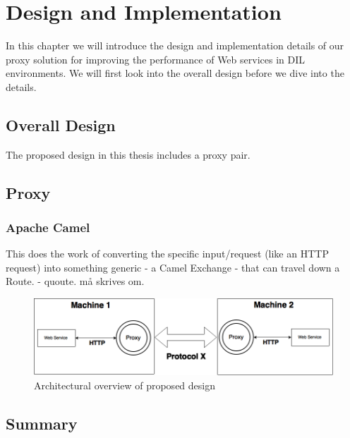 \chapter{Design and Implementation}

In this chapter we will introduce the design and implementation details of our
proxy solution for improving the performance of Web services in DIL
environments. We will first look into the overall design before we dive into the
details.

\section{Overall Design}

The proposed design in this thesis includes a proxy pair.


\section{Proxy}

\subsection{Apache Camel}

This does the work of converting the specific input/request (like an HTTP
request) into something generic - a Camel Exchange - that can travel down a
Route.
 - quoute. må skrives om.
\begin{figure}[h]
\includegraphics[scale=0.4]{images/architecture.png}
\caption{Architectural overview of proposed design}
\end{figure}


\section{Summary}
